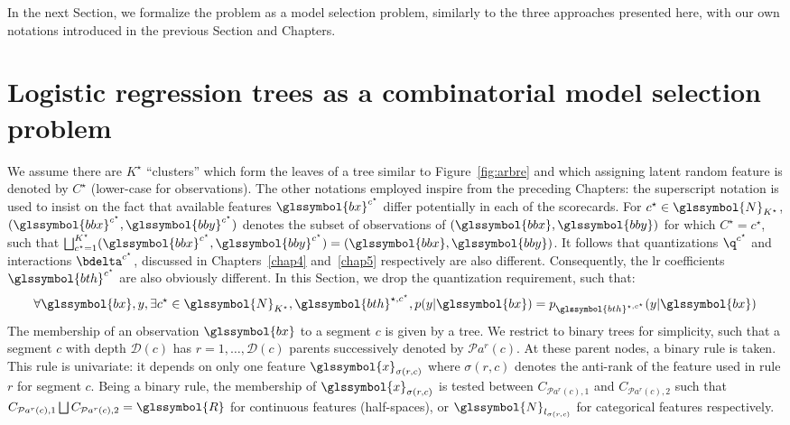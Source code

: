 In the next Section, we formalize the problem as a model selection problem, similarly to the three approaches presented here, with our own notations introduced in the previous Section and Chapters.


\section{Logistic regression trees as a combinatorial model selection problem} \label{sec:model_selec_tree}

We assume there are $K^\star$ ``clusters'' which form the leaves of a tree similar to Figure~\ref{fig:arbre} and which assigning latent random feature is denoted by $C^\star$ (lower-case for observations). The other notations employed inspire from the preceding Chapters: the superscript notation is used to insist on the fact that available features $\glssymbol{bx}^{c^\star}$ differ potentially in each of the scorecards. For $c^\star \in \glssymbol{N}_{K^\star}$, $(\glssymbol{bbx}^{c^\star}, \glssymbol{bby}^{c^\star})$ denotes the subset of observations of $(\glssymbol{bbx}, \glssymbol{bby})$ for which $C^\star = c^\star$, such that $ \bigsqcup_{c^\star=1}^{K^\star} (\glssymbol{bbx}^{c^\star}, \glssymbol{bby}^{c^\star}) = (\glssymbol{bbx}, \glssymbol{bby})$. It follows that quantizations $\q^{c^\star}$ and interactions $\bdelta^{c^\star}$, discussed in Chapters~\ref{chap4} and~\ref{chap5} respectively are also different. Consequently, the \gls{lr} coefficients $\glssymbol{bth}^{c^\star}$ are also obviously different. In this Section, we drop the quantization requirement, such that:
\begin{equation} \label{eq:lr_tree}
\forall \glssymbol{bx}, y, \exists c^\star \in \glssymbol{N}_{K^\star}, \glssymbol{bth}^{\star,c^\star}, p(y | \glssymbol{bx}) = p_{\glssymbol{bth}^{\star,c^\star}}(y | \glssymbol{bx})
\end{equation}
The membership of an observation $\glssymbol{bx}$ to a segment $c$ is given by a tree. We restrict to binary trees for simplicity, such that a segment $c$ with depth $\mathcal{D}(c)$ has $r = 1, \dots, \mathcal{D}(c)$ parents successively denoted by $\mathcal{P}a^r(c)$. At these parent nodes, a binary rule is taken. This rule is univariate: it depends on only one feature $\glssymbol{x}_{\sigma(r,c)}$ where $\sigma(r,c)$ denotes the anti-rank of the feature used in rule $r$ for segment $c$. Being a binary rule, the membership of $\glssymbol{x}_{\sigma(r,c)}$ is tested between $C_{\mathcal{P}a^r(c),1}$ and $C_{\mathcal{P}a^r(c),2}$ such that $C_{\mathcal{P}a^r(c),1} \bigsqcup C_{\mathcal{P}a^r(c),2} =\glssymbol{R}$ for continuous features (half-spaces), or $\glssymbol{N}_{l_{\sigma(r,c)}}$ for categorical features respectively. 
